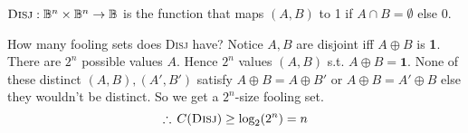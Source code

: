 \begin{example}
$\textsc{Disj} : \mathbb{B}^n \times \mathbb{B}^n \to \mathbb{B}$ is the function
that maps $(A, B)$ to 1 if $A \cap B = \emptyset$ else 0.
\end{example}
How many fooling sets does \textsc{Disj} have?
\pause
Notice $A, B$ are disjoint iff $A \oplus B$ is \textbf{1}.
\pause
There are $2^n$ possible values $A$.
\pause
Hence $2^n$ values $(A, B)$ s.t. $A \oplus B = \textbf{1}$.
None of these distinct $(A, B), (A', B')$ satisfy
 $A \oplus B = A \oplus B'$ or
$A \oplus B = A' \oplus B$
else they wouldn't be distinct.
\pause
So we get a $2^n$-size fooling set.
\pause
\[\therefore \, C(\textsc{Disj}) \geq \text{log}_2(2^n) = n\]